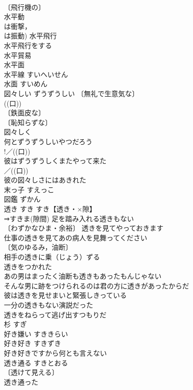 \documentclass[8pt]{extreport}
\begin{document}
\begin{CJK}{UTF8}{min}
\\	〔飛行機の〕
\\	水平動 
\\	は衝撃，
\\	は振動) 水平飛行 
\\	水平飛行をする 
\\	水平貿易 
\\	水平面 
\\	水平線	すいへいせん	
\\	水面	すいめん	
\\	図々しい	ずうずうしい	〔無礼で生意気な〕
\\	((口)) 
\\	〔鉄面皮な〕
\\	〔恥知らずな〕
\\	図々しく 
\\	何とずうずうしいやつだろう 
\\	!／((口)) 
\\	彼はずうずうしくまたやって来た 
\\	／((口)) 
\\	彼の図々しさにはあきれた 
\\	末っ子	すえっこ	
\\	図鑑	ずかん	
\\	透き	すき	すき【透き・×隙】 
\\	⇒すきま(隙間) 足を踏み入れる透きもない 
\\	〔わずかなひま・余裕〕 透きを見てやっておきます 
\\	仕事の透きを見てあの病人を見舞ってください 
\\	〔気のゆるみ，油断〕　
\\	相手の透きに乗（じょう）ずる 
\\	透きをつかれた 
\\	あの男はまったく油断も透きもあったもんじゃない 
\\	そんな男に跡をつけられるのは君の方に透きがあったからだ 
\\	彼は透きを見せまいと緊張しきっている 
\\	一分の透きもない演説だった 
\\	透きをねらって逃げ出すつもりだ 
\\	杉	すぎ	
\\	好き嫌い	すききらい	
\\	好き好き	すきずき	
\\	好き好きですから何とも言えない 
\\	透き通る	すきとおる	
\\	〔透けて見える〕
\\	透き通った 

\end{CJK}
\end{document}
